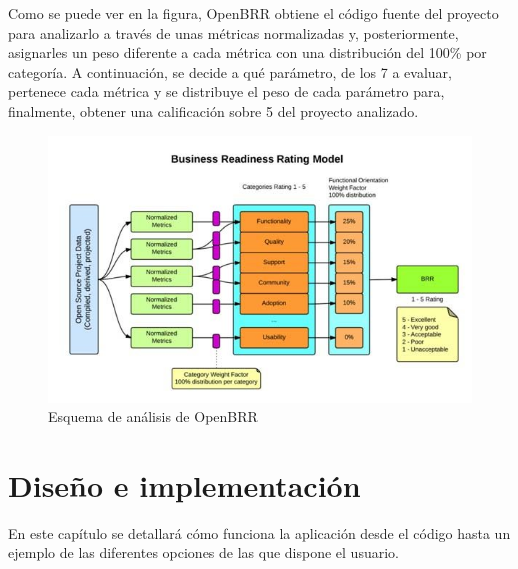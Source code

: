 \documentclass[a4paper, 12pt]{book}
\begin{document}
Como se puede ver en la figura, OpenBRR obtiene el código fuente del proyecto para analizarlo a través de unas métricas normalizadas y, posteriormente, asignarles un peso diferente a cada métrica con una distribución del 100\% por categoría. A continuación, se decide a qué parámetro, de los 7 a evaluar, pertenece cada métrica y se distribuye el peso de cada parámetro para, finalmente, obtener una calificación sobre 5 del proyecto analizado.
\begin{figure}
  \centering
  \includegraphics[width=18cm, keepaspectratio]{img/openbrr.png}
  \caption{Esquema de análisis de OpenBRR}\label{fig:OpenBRR}
\end{figure}
\cleardoublepage
\chapter{Diseño e implementación}
\label{chap:diseño}
En este capítulo se detallará cómo funciona la aplicación desde el código hasta un ejemplo de las diferentes opciones de las que dispone el usuario.
\end{document}

